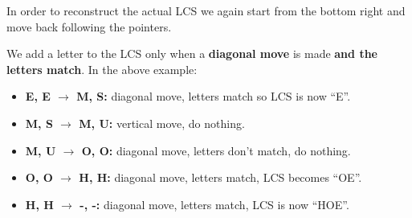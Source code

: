 \documentclass[12pt, letterpaper]{article}
\begin{document}
In order to reconstruct the actual LCS we again start from the bottom right and move back following the pointers.

We add a letter to the LCS only when a \textbf{diagonal move} is made \textbf{and the letters match}. In the above example:
\begin{itemize}
\item \textbf{E, E $\rightarrow$ M, S:} diagonal move, letters match so LCS is now ``E''.
\item \textbf{M, S $\rightarrow$ M, U:} vertical move, do nothing.
\item \textbf{M, U $\rightarrow$ O, O:} diagonal move, letters don't match, do nothing.
\item \textbf{O, O $\rightarrow$ H, H:} diagonal move, letters match, LCS becomes ``OE''.
\item \textbf{H, H $\rightarrow$ -, -:} diagonal move, letters match, LCS is now ``HOE''.
\end{itemize}
\end{document}
